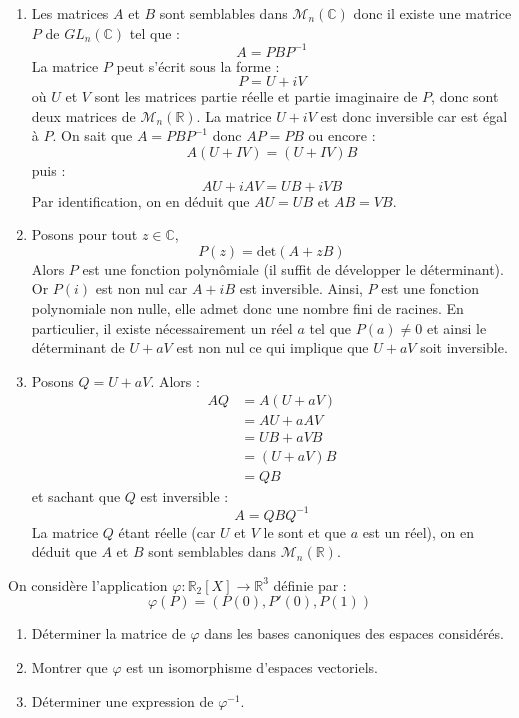 \documentclass[a4paper,10pt]{report}
\begin{document}
\corr \begin{enumerate}
\item Les matrices $A$ et $B$ sont semblables dans $\mathcal{M}_n(\mathbb{C})$ donc il existe une matrice $P$ de $GL_n(\mathbb{C})$ tel que :
$$ A=PBP^{-1}$$
La matrice $P$ peut s'écrit sous la forme :
$$ P = U+i V$$
où $U$ et $V$ sont les matrices \og partie réelle \fg et \og partie imaginaire \fg de $P$, donc sont deux matrices de $\mathcal{M}_n(\mathbb{R})$. La matrice $U+iV$ est donc inversible car est égal à $P$. On sait que $A=PBP^{-1}$ donc $AP=PB$ ou encore :
$$ A(U+IV) = (U+IV)B$$
puis :
$$ AU+ i AV = UB + i VB$$
Par identification, on en déduit que $AU=UB$ et $AB=VB$.
\item Posons pour tout $z \in \mathbb{C}$,
$$ P(z) = \textrm{det}(A+zB)$$
Alors $P$ est une fonction polynômiale (il suffit de développer le déterminant). Or $P(i)$ est non nul car $A+iB$ est inversible. Ainsi, $P$ est une fonction polynomiale non nulle, elle admet donc une nombre fini de racines. En particulier, il existe nécessairement un réel $a$ tel que $P(a) \neq 0$ et ainsi le déterminant de $U+aV$ est non nul ce qui implique que $U+aV$ soit inversible.
\item Posons $Q=U+aV$. Alors :
\begin{align*}
AQ & = A(U+aV) \\
& = AU + a AV \\
& = UB + a VB \\
& = (U+aV)B \\
& = QB
\end{align*}
et sachant que $Q$ est inversible :
$$ A= QBQ^{-1}$$
La matrice $Q$ étant réelle (car $U$ et $V$ le sont et que $a$ est un réel), on en déduit que $A$ et $B$ sont semblables dans $\mathcal{M}_n(\mathbb{R})$.
\end{enumerate}

\begin{Exercice}{} On considère l'application $\varphi : \mathbb{R}_2[X] \rightarrow \mathbb{R}^3$ définie par :
\[ \varphi(P)=(P(0),P'(0),P(1)) \]

\begin{enumerate}
\item Déterminer la matrice de $\varphi$ dans les bases canoniques des espaces considérés.
\item Montrer que $\varphi$ est un isomorphisme d'espaces vectoriels.
\item Déterminer une expression de $\varphi^{-1}$.
\end{enumerate}
\end{Exercice} 
\end{document}
